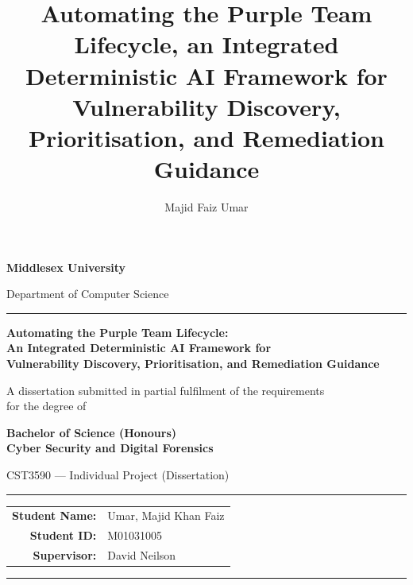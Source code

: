 \documentclass[12pt, a4paper, oneside]{report}
\title{Automating the Purple Team Lifecycle, an Integrated Deterministic AI Framework for Vulnerability Discovery, Prioritisation, and Remediation Guidance}
\author{Majid Faiz Umar}
\date{}
\begin{document}

\begin{titlepage}
  \centering

  {\large\bfseries Middlesex University\par}
  {\normalsize Department of Computer Science\par}
  \vspace{0.4cm}
  \rule{\linewidth}{0.4pt}

  \vfill

  {\LARGE\bfseries Automating the Purple Team Lifecycle:\\[0.3em]
  An Integrated Deterministic AI Framework for\\[0.3em]
  Vulnerability Discovery, Prioritisation, and Remediation Guidance\par}

  \vspace{1.2cm}

  {\normalsize A dissertation submitted in partial fulfilment of the requirements\\[0.3em]
  for the degree of\par}
  \vspace{0.4cm}
  {\large\bfseries Bachelor of Science (Honours)\\[0.2em]
  Cyber Security and Digital Forensics\par}

  \vfill

  {\normalsize CST3590 — Individual Project (Dissertation)\par}

  \vspace{1.2cm}
  \rule{\linewidth}{0.4pt}
  \vspace{0.5cm}

  \begin{tabular}{rl}
    \textbf{Student Name:} & Umar, Majid Khan Faiz \\
    \textbf{Student ID:}   & M01031005 \\
    \textbf{Supervisor:}   & David Neilson \\
  \end{tabular}

  \vspace{0.8cm}
  \rule{\linewidth}{0.4pt}

\end{titlepage}
\end{document}
